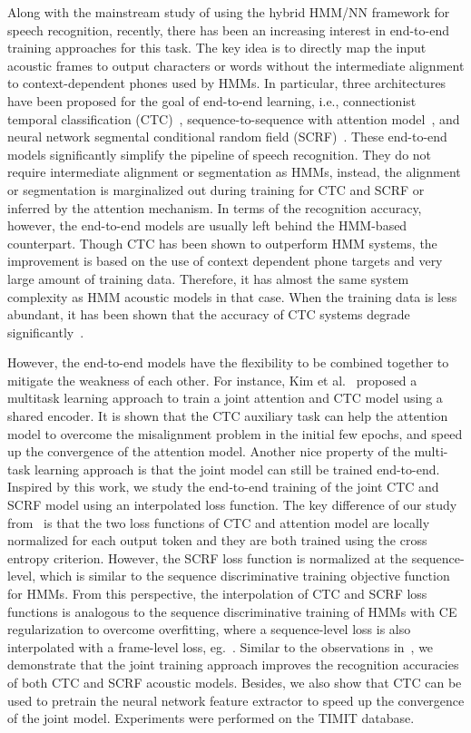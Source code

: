 \documentclass[a4paper]{article}
\begin{document}
Along with the mainstream study of using the hybrid HMM/NN framework for speech recognition, recently, there has been an increasing interest in end-to-end training approaches for this task. The key idea is to directly map the input acoustic frames to output characters or words without the intermediate alignment to context-dependent phones used by HMMs. In particular, three architectures have been proposed for the goal of end-to-end learning, i.e., connectionist temporal classification (CTC)~\cite{graves2014towards, Hannun2014Deep, sak2015learning, miao2015eesen}, sequence-to-sequence with attention model~\cite{chorowski2015attention, lu2015study, chan2016listen}, and neural network segmental conditional random field (SCRF)~\cite{abdel2013deep, lu2016segmental}. These end-to-end models significantly simplify the pipeline of speech recognition. They do not require intermediate alignment or segmentation as HMMs, instead, the alignment or segmentation is marginalized out during training for CTC and SCRF or inferred by the attention mechanism. In terms of the recognition accuracy, however, the end-to-end models are usually left behind the HMM-based counterpart. Though CTC has been shown to outperform HMM systems\cite{sak2015fast}, the improvement is based on the use of context dependent phone targets and very large amount of training data. Therefore, it has almost the same system complexity as HMM acoustic models in that case. When the training data is less abundant, it has been shown that the accuracy of CTC systems degrade significantly~\cite{pundak2016lower}. 

However, the end-to-end models have the flexibility to be combined together to mitigate the weakness of each other. For instance, Kim et al.~\cite{kim2016joint} proposed a multitask learning approach to train a joint attention and CTC model using a shared encoder. It is shown that the CTC auxiliary task can help the attention model to overcome the misalignment problem in the initial few epochs, and speed up the convergence of the attention model. Another nice property of the multi-task learning approach is that the joint model can still be trained end-to-end. Inspired by this work, we study the end-to-end training of the joint CTC and SCRF model using an interpolated loss function. The key difference of our study from~\cite{kim2016joint} is that the two loss functions of CTC and attention model are locally normalized for each output token and they are both trained using the cross entropy criterion. However, the SCRF loss function is normalized at the sequence-level, which is similar to the sequence discriminative training objective function for HMMs. From this perspective, the interpolation of CTC and SCRF loss functions is analogous to the sequence discriminative training of HMMs with CE regularization to overcome overfitting, where a sequence-level loss is also interpolated with a frame-level loss, eg.~\cite{su2013error}. Similar to the observations in~\cite{kim2016joint}, we demonstrate that the joint training approach improves the recognition accuracies of both CTC and SCRF acoustic models. Besides, we also show that CTC can be used to pretrain the neural network feature extractor to speed up the convergence of the joint model. Experiments were performed on the TIMIT database. 
\end{document}
